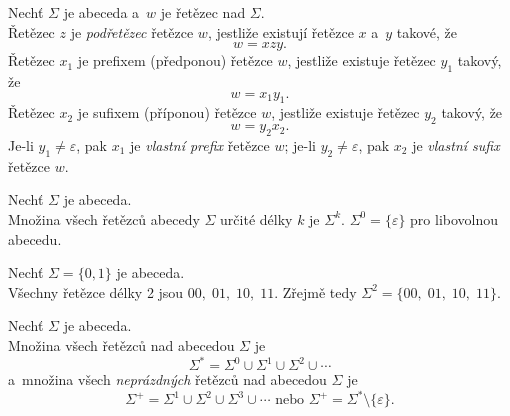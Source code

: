 \begin{definition}
    Nechť $\Sigma$ je abeceda a~$w$ je řetězec nad $\Sigma$.\\
    Řetězec $z$ je \emph{podřetězec} řetězce $w$, jestliže existují řetězce $x$ a~$y$ takové, že
    \begin{equation*}
        w = xzy.
    \end{equation*}
    Řetězec $x_1$ je prefixem (předponou) řetězce $w$, jestliže existuje řetězec $y_1$ takový, že
    \begin{equation*}
        w = x_1y_1.
    \end{equation*}
    Řetězec $x_2$ je sufixem (příponou) řetězce $w$, jestliže existuje řetězec $y_2$ takový, že
    \begin{equation*}
        w = y_2x_2.
    \end{equation*}
    Je-li $y_1 \neq \varepsilon$, pak $x_1$ je \emph{vlastní prefix} řetězce $w$; je-li $y_2 \neq \varepsilon$, pak $x_2$ je \emph{vlastní sufix} řetězce $w$.
\end{definition}

\begin{definition}
    Nechť $\Sigma$ je abeceda.\\
    Množina všech řetězců abecedy $\Sigma$ určité délky $k$ je $\Sigma^k$.
    $\Sigma^0 = \{\varepsilon\}$ pro libovolnou abecedu.
\end{definition}

\begin{example}
    Nechť $\Sigma = \{0, 1\}$ je abeceda.\\
    Všechny řetězce délky 2 jsou $00,\; 01,\; 10,\; 11$.
    Zřejmě tedy $\Sigma^2 = \{00,\; 01,\; 10,\; 11\}$.
\end{example}

\begin{definition}
    Nechť $\Sigma$ je abeceda.\\
    Množina všech řetězců nad abecedou $\Sigma$ je
    \begin{equation*}
        \Sigma^* = \Sigma^0 \cup \Sigma^1 \cup \Sigma^2 \cup \cdots
    \end{equation*}
    a~množina všech \emph{neprázdných} řetězců nad abecedou $\Sigma$ je
    \begin{equation*}
        \Sigma^+ = \Sigma^1 \cup \Sigma^2 \cup \Sigma^3 \cup \cdots \text{ nebo } \Sigma^+ = \Sigma^* \setminus \{\varepsilon\}.
    \end{equation*}
\end{definition}

